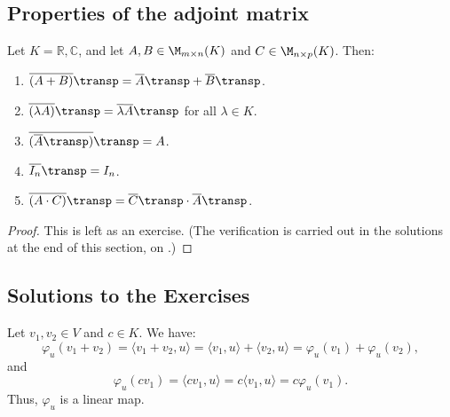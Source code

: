 \subsection*{Properties of the adjoint matrix}

\begin{proposition}
\label{prop:properties_adjoint_matrix}
Let $K = \mathbb{R}, \mathbb{C}$, and let $A, B \in \M_{m \times n}(K)$ and $C \in \M_{n \times p}(K)$. Then:
\begin{enumerate}[label=\textbf{(\alph*)}]
    \item $\overline{(A+B)}\transp = \overline{A}\transp + \overline{B}\transp$.
    \item $\overline{(\lambda A)}\transp = \overline{\lambda} \overline{A}\transp$ for all $\lambda \in K$.
    \item $\overline{(\overline{A}\transp)}\transp = A$.
    \item $\overline{I_n}\transp = I_n$.
    \item $\overline{(A \cdot C)}\transp = \overline{C}\transp \cdot \overline{A}\transp$.
\end{enumerate}
\end{proposition}

\begin{proof}
This is left as an exercise. (The verification is carried out in the solutions at the end of this section, on .)
\end{proof}


\subsection{Solutions to the Exercises}
\label{sec:solutions_dual_spaces_inner_products}

\begin{exercisesolution}
\label{sol:linearity_phi_u}
Let $v_1, v_2 \in V$ and $c \in K$. We have:
\[
    \varphi_u(v_1 + v_2) = \langle v_1 + v_2, u \rangle = \langle v_1, u \rangle + \langle v_2, u \rangle = \varphi_u(v_1) + \varphi_u(v_2),
\]
and
\[
    \varphi_u(c v_1) = \langle c v_1, u \rangle = c \langle v_1, u \rangle = c \varphi_u(v_1).
\]
Thus, $\varphi_u$ is a linear map.
\end{exercisesolution}

